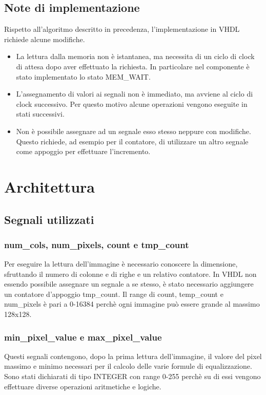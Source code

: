 \documentclass{article}
\begin{document}
\subsection{Note di implementazione}
Rispetto all'algoritmo descritto in precedenza, l'implementazione in VHDL richiede alcune modifiche.
\begin{itemize}
    \item La lettura dalla memoria non è istantanea, ma necessita di un ciclo di clock di attesa dopo aver effettuato la richiesta. In particolare nel componente è stato implementato lo stato MEM\_WAIT.
    \item L'assegnamento di valori ai segnali non è immediato, ma avviene al ciclo di clock successivo. Per questo motivo alcune operazioni vengono eseguite in stati successivi.
    \item Non è possibile assegnare ad un segnale esso stesso neppure con modifiche. Questo richiede, ad esempio per il contatore, di utilizzare un altro segnale come appoggio per effettuare l'incremento.
\end{itemize}

\pagebreak

\section{Architettura}
\subsection{Segnali utilizzati}

\subsubsection{num\_cols, num\_pixels, count e tmp\_count}
Per eseguire la lettura dell'immagine è necessario conoscere la dimensione, sfruttando il numero di colonne e di righe e un relativo contatore. In VHDL non essendo possibile assegnare un segnale a se stesso, è stato necessario aggiungere un contatore d'appoggio tmp\_count. Il range di count, temp\_count e num\_pixels è pari a 0-16384 perchè ogni immagine può essere grande al massimo 128x128.

\subsubsection{min\_pixel\_value e max\_pixel\_value}
Questi segnali contengono, dopo la prima lettura dell'immagine, il valore del pixel massimo e minimo necessari per il calcolo delle varie formule di equalizzazione. Sono stati dichiarati di tipo INTEGER con range 0-255 perchè su di essi vengono effettuare diverse operazioni aritmetiche e logiche.
\end{document}
